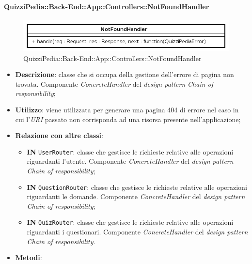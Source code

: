 \paragraph{QuizziPedia::Back-End::App::Controllers::NotFoundHandler}
\label{QuizziPedia::Back-End::App::Controllers::NotFoundHandler}
\begin{figure}[ht]
	\centering
	\includegraphics[scale=0.8]{UML/Package/QuizziPedia_Back-End_App_Controllers_notFoundHandler.png}
	\caption{QuizziPedia::Back-End::App::Controllers::NotFoundHandler}
\end{figure}
\FloatBarrier
\begin{itemize}
	\item \textbf{Descrizione}:
	classe che si occupa della gestione dell'errore di pagina non trovata. Componente \textit{ConcreteHandler} del \textit{design pattern} \textit{Chain of responsibility};
	\item \textbf{Utilizzo}:
	viene utilizzata per generare una pagina 404 di errore nel caso in cui l'\textit{URI} passato non corrisponda ad una risorsa presente nell'applicazione;
	\item \textbf{Relazione con altre classi}:
	\begin{itemize}
		\item \textbf{IN} \texttt{UserRouter}:
		classe che gestisce le richieste relative alle operazioni riguardanti l'utente. Componente \textit{ConcreteHandler} del \textit{design pattern} \textit{Chain of responsibility};
		\item \textbf{IN} \texttt{QuestionRouter}:
		classe che gestisce le richieste relative alle operazioni riguardanti le domande. Componente \textit{ConcreteHandler} del \textit{design pattern} \textit{Chain of responsibility};
		\item \textbf{IN} \texttt{QuizRouter}:
		classe che gestisce le richieste relative alle operazioni riguardanti i questionari. Componente \textit{ConcreteHandler} del \textit{design pattern} \\\textit{Chain of responsibility}.
	\end{itemize}
	\item \textbf{Metodi}:
	\begin{itemize}

\end{itemize}
\end{itemize}
